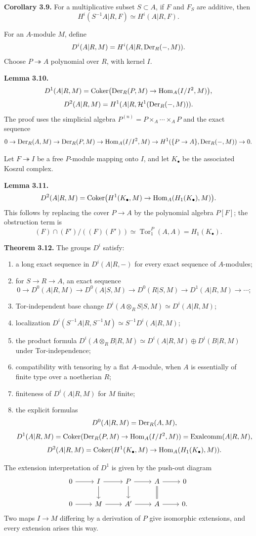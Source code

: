 \documentclass[11pt]{article}
\providecommand{\Tor}{\operatorname{Tor}}
\providecommand{\Hom}{\operatorname{Hom}}
\begin{document}
\textbf{Corollary 3.9.}  For a multiplicative subset \(S\subset A\), if \(F\) and \(F_S\) are additive, then
\[
H^i(S^{-1}A|R,F)\simeq H^i(A|R,F).
\]

For an \(A\)-module \(M\), define
\[
D^i(A|R,M)=H^i(A|R,\operatorname{Der}_R(-,M)).
\]
Choose \(P\twoheadrightarrow A\) polynomial over \(R\), with kernel \(I\).

\textbf{Lemma 3.10.}
\[
D^1(A|R,M)=\Coker\bigl(\Der_R(P,M)\to\Hom_A(I/I^2,M)\bigr),
\]
\[
D^2(A|R,M)=H^1(A|R,\mathcal H^1(\operatorname{Der}_R(-,M))).
\]
The proof uses the simplicial algebra \(P^{(n)}=P\times_A\cdots\times_AP\) and the exact sequence
\[
0\to\Der_R(A,M)\to\Der_R(P,M)\to\Hom_A(I/I^2,M)\to H^1(\{P\to A\},\Der_R(-,M))\to0.
\]

Let \(F\twoheadrightarrow I\) be a free \(P\)-module mapping onto \(I\), and let \(K_\bullet\) be the associated Koszul complex.

\textbf{Lemma 3.11.}
\[
D^2(A|R,M)=\Coker\bigl(H^1(K_\bullet,M)\to\Hom_A(H_1(K_\bullet),M)\bigr).
\]
This follows by replacing the cover \(P\to A\) by the polynomial algebra \(P[F]\); the obstruction term is
\[
(F)\cap(F')/((F)(F'))\simeq \Tor^P_1(A,A)=H_1(K_\bullet).
\]

\textbf{Theorem 3.12.}  The groups \(D^i\) satisfy:
\begin{enumerate}[label=\textup{(\arabic*)}]
\item a long exact sequence in \(D^i(A|R,-)\) for every exact sequence of \(A\)-modules;
\item for \(S\to R\to A\), an exact sequence
\[
0\to D^0(A|R,M)\to D^0(A|S,M)\to D^0(R|S,M)\to D^1(A|R,M)\to\cdots;
\]
\item Tor-independent base change \(D^i(A\otimes_RS|S,M)\simeq D^i(A|R,M)\);
\item localization \(D^i(S^{-1}A|R,S^{-1}M)\simeq S^{-1}D^i(A|R,M)\);
\item the product formula \(D^i(A\otimes_RB|R,M)\simeq D^i(A|R,M)\oplus D^i(B|R,M)\) under Tor-independence;
\item compatibility with tensoring by a flat \(A\)-module, when \(A\) is essentially of finite type over a noetherian \(R\);
\item finiteness of \(D^i(A|R,M)\) for \(M\) finite;
\item the explicit formulas
\[
D^0(A|R,M)=\operatorname{Der}_R(A,M),
\]
\[
D^1(A|R,M)=\Coker(\Der_R(P,M)\to\Hom_A(I/I^2,M))=\Exalcomm(A|R,M),
\]
\[
D^2(A|R,M)=\Coker(H^1(K_\bullet,M)\to\Hom_A(H_1(K_\bullet),M)).
\]
\end{enumerate}
The extension interpretation of \(D^1\) is given by the push-out diagram
\[
\begin{tikzcd}
0\arrow[r]&I\arrow[r]\arrow[d]&P\arrow[r]\arrow[d]&A\arrow[r]\arrow[d,equal]&0\\
0\arrow[r]&M\arrow[r]&A'\arrow[r]&A\arrow[r]&0.
\end{tikzcd}
\]
Two maps \(I\to M\) differing by a derivation of \(P\) give isomorphic extensions, and every extension arises this way.
\end{document}
